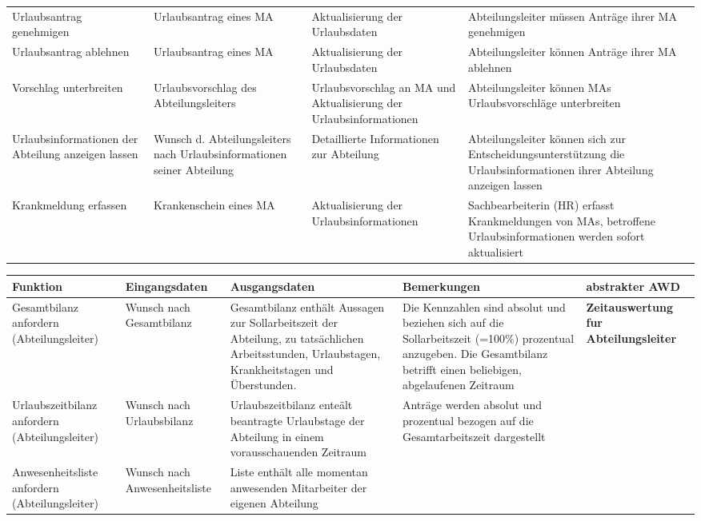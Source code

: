 {\begin{tabular}{|p{3cm}|p{4cm}|p{4cm}|p{4cm}|p{2cm}|}
		\\
	\cline{1-4}
		Urlaubsantrag genehmigen &
		Urlaubsantrag eines MA &
		Aktualisierung der Urlaubsdaten &
		Abteilungsleiter m\"ussen Antr\"age ihrer MA genehmigen &
		\\
	\cline{1-4}
		Urlaubsantrag ablehnen &
		Urlaubsantrag eines MA &
		Aktualisierung der Urlaubsdaten &
		Abteilungsleiter k\"onnen Antr\"age ihrer MA ablehnen &
		\\
	\cline{1-4}
		Vorschlag unterbreiten &
		Urlaubsvorschlag des Abteilungsleiters &
		Urlaubsvorschlag an MA und Aktualisierung der Urlaubsinformationen &
		Abteilungsleiter k\"onnen MAs Urlaubsvorschl\"age unterbreiten &
		\\
	\cline{1-4}
		Urlaubsinformationen der Abteilung anzeigen lassen &
		Wunsch d. Abteilungsleiters nach Urlaubsinformationen seiner Abteilung &
		Detaillierte Informationen zur Abteilung &
		Abteilungsleiter k\"onnen sich zur Entscheidungsunterst\"utzung die Urlaubsinformationen ihrer Abteilung anzeigen lassen &
		\\
	\hline
		Krankmeldung erfassen &
		Krankenschein eines MA &
		Aktualisierung der Urlaubsinformationen &
		Sachbearbeiterin (HR) erfasst Krankmeldungen von MAs, betroffene Urlaubsinformationen werden sofort aktualisiert &
		 \\
	\hline
	
\end{tabular}
}


\hspace{-3,5cm}
{\footnotesize
\begin{tabular}{|p{3cm}|p{4cm}|p{4cm}|p{4cm}|p{2cm}|}
	\hline
		\textbf{Funktion	} &	
		\textbf{Eingangsdaten} &
		\textbf{Ausgangsdaten}& 
		\textbf{Bemerkungen}	&
		\textbf{abstrakter AWD} \\
	\hline \hline 
		Gesamtbilanz anfordern (Abteilungsleiter) &
		Wunsch nach Gesamtbilanz &
		Gesamtbilanz enth\"alt Aussagen zur Sollarbeitszeit der Abteilung, zu tats\"achlichen Arbeitsstunden, Urlaubstagen, Krankheitstagen und \"Uberstunden.  &
		Die Kennzahlen sind absolut und beziehen sich auf die Sollarbeitszeit (=100\%) prozentual anzugeben. Die Gesamtbilanz betrifft einen beliebigen, abgelaufenen Zeitraum &
		\textbf{Zeitauswertung fur Abteilungsleiter}\\
	\cline{1-4}
		Urlaubszeitbilanz anfordern (Abteilungsleiter) &
		Wunsch nach Urlaubsbilanz &
		Urlaubszeitbilanz ente\"alt beantragte Urlaubstage der Abteilung in einem vorausschauenden Zeitraum &
		Antr\"age werden absolut und prozentual bezogen auf die Gesamtarbeitszeit dargestellt &
		\\ 
	\cline{1-4}
		Anwesenheitsliste anfordern (Abteilungsleiter) &
		Wunsch nach Anwesenheitsliste &
		Liste enth\"alt alle momentan anwesenden Mitarbeiter der eigenen Abteilung &
		&
		\\
	\hline
	
\end{tabular}
}

